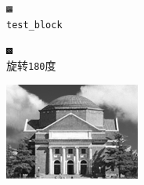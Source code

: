 \documentclass{article}
\numberwithin{figure}{section}
\numberwithin{table}{section}
\numberwithin{listing}{section}
\numberwithin{equation}{section}
\begin{document}
\begin{enumerate}
\begin{itemize}
                        \begin{figure}[H]
                            \centering
                            \begin{subfigure}{0.5\textwidth}
                                \centering
                                \includegraphics[width=0.6\linewidth]{test_block}
                                \caption{\texttt{test\_block}}
                            \end{subfigure}%
                            \begin{subfigure}{0.5\textwidth}
                                \centering
                                \includegraphics[width=0.6\linewidth]{test_block_rot180}
                                \caption{旋转\texttt{180}度}
                            \end{subfigure}
                            \begin{subfigure}{0.5\textwidth}
                                \centering
                                \includegraphics[width=0.6\linewidth]{hall_gray}

\end{subfigure}
\end{figure}
\end{itemize}
\end{enumerate}
\end{document}
